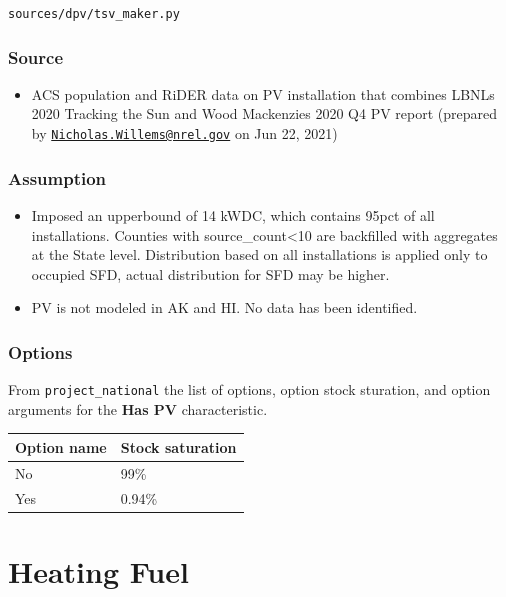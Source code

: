\texttt{sources/dpv/tsv\_maker.py}

\subsubsection{Source}\label{source-84}

\begin{itemize}
 
\item
  ACS population and RiDER data on PV installation that combines
  LBNL\textquotesingle s 2020 Tracking the Sun and Wood
  Mackenzie\textquotesingle s 2020 Q4 PV report (prepared by
  \href{mailto:Nicholas.Willems@nrel.gov}{\nolinkurl{Nicholas.Willems@nrel.gov}}
  on Jun 22, 2021)
\end{itemize}

\subsubsection{Assumption}\label{assumption-49}

\begin{itemize}
 
\item
  Imposed an upperbound of 14 kWDC, which contains 95pct of all
  installations. Counties with source\_count\textless10 are backfilled
  with aggregates at the State level. Distribution based on all
  installations is applied only to occupied SFD, actual distribution for
  SFD may be higher.
\item
  PV is not modeled in AK and HI. No data has been identified.
\end{itemize}

\subsubsection{Options}\label{options-85}

From \texttt{project\_national} the list of options, option stock
sturation, and option arguments for the \textbf{Has PV} characteristic.

\begin{longtable}[]{@{}ll@{}}
\toprule\noalign{}
Option name & Stock saturation \\
\midrule\noalign{}
\endhead
\bottomrule\noalign{}
\endlastfoot
No & 99\% \\
Yes & 0.94\% \\
\end{longtable}

\section{Heating Fuel}\label{heating_fuel}

